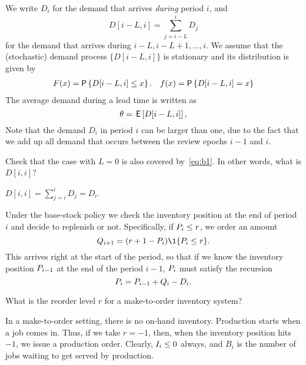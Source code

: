 We write $D_i$ for the demand that arrives \emph{during} period $i$, and 
\begin{equation}\label{eq:b1}
  D[i-L, i] = \sum_{j=i-L}^i D_j
\end{equation}
for the demand that arrives during $i-L, i-L+1, \ldots, i$.   We assume that the (stochastic) demand process $\{D[i-L, i]\}$ is stationary and its distribution is given by 
\begin{align}
  \label{eq:16}
   F(x) &= \P{D[i-L, i] \leq x}.& f(x) = \P{D[i-L, i] = x}
\end{align}
The average demand during a lead time is written as
\begin{equation*}
\theta = \,\mathsf{E}\left[D[i-L, i]\right],
\end{equation*}
Note that the demand $D_i$ in period $i$ can be larger than one, due to the fact that we add up all demand that occurs between the review epochs $i-1$ and $i$.

\begin{exercise}
Check that the case with $L=0$ is also covered by~\eqref{eq:b1}. In other words, what is $D[i,i]$?
  \begin{solution}
    $D[i,i] = \sum_{j=i}^i D_j = D_i$. 
  \end{solution}
\end{exercise}


Under the base-stock policy we check the inventory position at the end of period $i$ and decide to replenish or not. Specifically,  if $P_i\leq r$, we order an amount 
\begin{equation}\label{eq:11}
  Q_{i+1} = (r+1 - \IP_i) \1{\IP_i \leq r}.
\end{equation}
This arrives right at the start of the period, so that if we know   the inventory position $P_{i-1}$ at the end of the period $i-1$, $P_i$ must satisfy the recursion
\begin{equation}\label{eq:10}
  P_{i} = P_{i-1}+Q_i - D_i.
\end{equation}


\begin{exercise}
  What is the reorder level $r$ for a make-to-order inventory system?

\begin{solution}
  In a make-to-order setting, there is no on-hand
  inventory. Production starts when a job comes in. Thus, if we take
  $r=-1$, then, when the inventory position hits $-1$, we issue a
  production order. Clearly, $I_i\leq0$ always, and $B_i$ is the number
  of jobs waiting to get served by production.
\end{solution}
\end{exercise}

